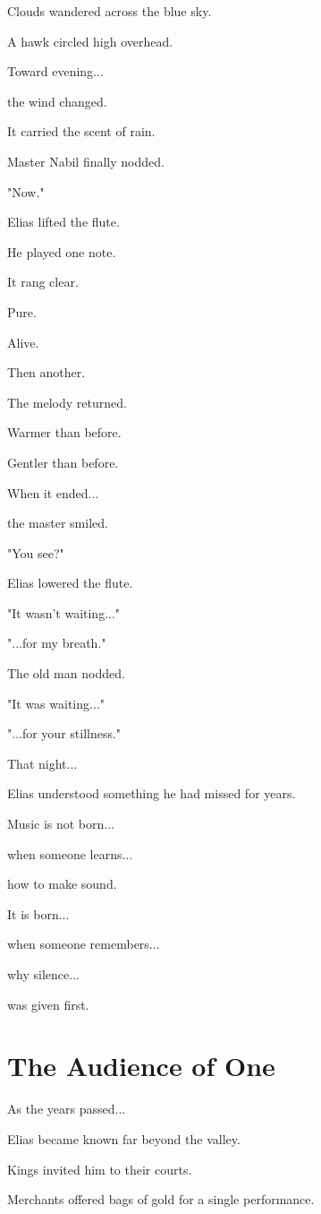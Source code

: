 \documentclass[12pt,openany]{book}
\begin{document}
Clouds wandered across the blue sky.

A hawk circled high overhead.

Toward evening...

the wind changed.

It carried the scent of rain.

Master Nabil finally nodded.

"Now."

Elias lifted the flute.

He played one note.

It rang clear.

Pure.

Alive.

Then another.

The melody returned.

Warmer than before.

Gentler than before.

When it ended...

the master smiled.

"You see?"

Elias lowered the flute.

"It wasn't waiting..."

"...for my breath."

The old man nodded.

"It was waiting..."

"...for your stillness."

That night...

Elias understood something he had missed for years.

Music is not born...

when someone learns...

how to make sound.

It is born...

when someone remembers...

why silence...

was given first.
\section*{The Audience of One}

As the years passed...

Elias became known far beyond the valley.

Kings invited him to their courts.

Merchants offered bags of gold for a single performance.
\end{document}
